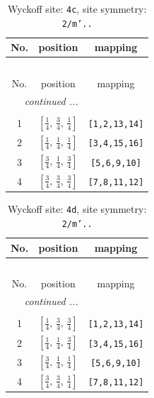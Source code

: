 \documentclass[fleqn,8pt]{jsarticle}
\begin{document}
\renewcommand{\arraystretch}{1.2}
\begin{longtable}{ccc}
\caption{Wyckoff site: {\tt 4c}, site symmetry: {\tt 2/m'..}}
 \\
 \hline \hline
No. & position & mapping \\ \hline \endfirsthead

\multicolumn{2}{l}{\tablename\ \thetable{}} \\
 \hline \hline
No. & position & mapping \\ \hline \endhead

 \hline \hline
\multicolumn{2}{r}{\footnotesize\it continued ...} \\ \endfoot

 \hline \hline
\multicolumn{2}{r}{} \\ \endlastfoot

1 & $\left[ \frac{1}{4},\, \frac{3}{4},\, \frac{1}{4} \right]$ & {\tt [1,2,13,14]} \\ \hline
2 & $\left[ \frac{1}{4},\, \frac{1}{4},\, \frac{1}{4} \right]$ & {\tt [3,4,15,16]} \\ \hline
3 & $\left[ \frac{3}{4},\, \frac{1}{4},\, \frac{3}{4} \right]$ & {\tt [5,6,9,10]} \\ \hline
4 & $\left[ \frac{3}{4},\, \frac{3}{4},\, \frac{3}{4} \right]$ & {\tt [7,8,11,12]} \\
\end{longtable}
\renewcommand{\arraystretch}{1.2}
\begin{longtable}{ccc}
\caption{Wyckoff site: {\tt 4d}, site symmetry: {\tt 2/m'..}}
 \\
 \hline \hline
No. & position & mapping \\ \hline \endfirsthead

\multicolumn{2}{l}{\tablename\ \thetable{}} \\
 \hline \hline
No. & position & mapping \\ \hline \endhead

 \hline \hline
\multicolumn{2}{r}{\footnotesize\it continued ...} \\ \endfoot

 \hline \hline
\multicolumn{2}{r}{} \\ \endlastfoot

1 & $\left[ \frac{1}{4},\, \frac{3}{4},\, \frac{3}{4} \right]$ & {\tt [1,2,13,14]} \\ \hline
2 & $\left[ \frac{1}{4},\, \frac{1}{4},\, \frac{3}{4} \right]$ & {\tt [3,4,15,16]} \\ \hline
3 & $\left[ \frac{3}{4},\, \frac{1}{4},\, \frac{1}{4} \right]$ & {\tt [5,6,9,10]} \\ \hline
4 & $\left[ \frac{3}{4},\, \frac{3}{4},\, \frac{1}{4} \right]$ & {\tt [7,8,11,12]} \\
\end{longtable}
\end{document}
